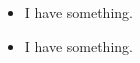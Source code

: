 \documentclass{article}
\newcommand{\resumeItemListStart}{\begin{itemize}}
\newcommand{\resumeItemListEnd}{\end{itemize}\vspace{0pt}}
\newcommand{\resumeItem}[1]{
  \item{
    {#1 \vspace{-1pt}}
  }
}
\begin{document}
\resumeItemListStart
	\resumeItem{I have something.}
	\resumeItem{I have something.}
\resumeItemListEnd
\end{document}
